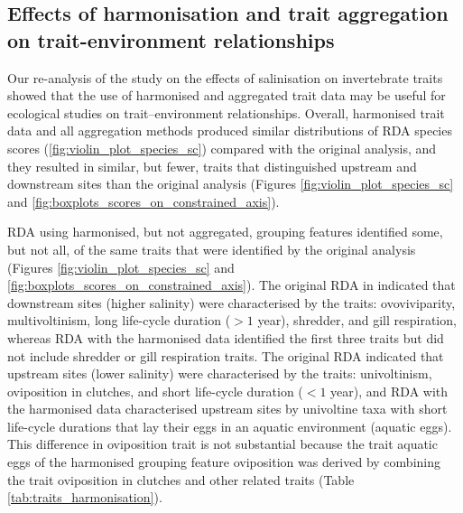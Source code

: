 \documentclass{article}
\begin{document}
\newpage


\subsection*{Effects of harmonisation and trait aggregation on trait-environment relationships}

Our re-analysis of the \citet{szocs_effects_2014} study on the effects of salinisation on invertebrate traits showed that the use of harmonised and aggregated trait data may be useful for ecological studies on trait–environment relationships. Overall, harmonised trait data and all aggregation methods produced similar distributions of RDA species scores (\ref{fig:violin_plot_species_sc}) compared with the original analysis, and they resulted in similar, but fewer, traits that distinguished upstream and downstream sites than the original analysis (Figures \ref{fig:violin_plot_species_sc} and \ref{fig:boxplots_scores_on_constrained_axis}).

RDA using harmonised, but not aggregated, grouping features identified some, but not all, of the same traits that were identified by the original analysis (Figures \ref{fig:violin_plot_species_sc} and \ref{fig:boxplots_scores_on_constrained_axis}). The original RDA in \citet{szocs_effects_2014} indicated that downstream sites (higher salinity) were characterised by the traits: ovoviviparity, multivoltinism, long life-cycle duration ($> 1$ year), shredder, and gill respiration, whereas RDA with the harmonised data identified the first three traits but did not include shredder or gill respiration traits. The original RDA indicated that upstream sites (lower salinity) were characterised by the traits: univoltinism, oviposition in clutches, and short life-cycle duration ($< 1$ year), and RDA with the harmonised data characterised upstream sites by univoltine taxa with short life-cycle durations that lay their eggs in an aquatic environment (aquatic eggs). This difference in oviposition trait is not substantial because the trait aquatic eggs of the harmonised grouping feature oviposition was derived by combining the trait oviposition in clutches and other related traits (Table \ref{tab:traits_harmonisation}).
\end{document}
